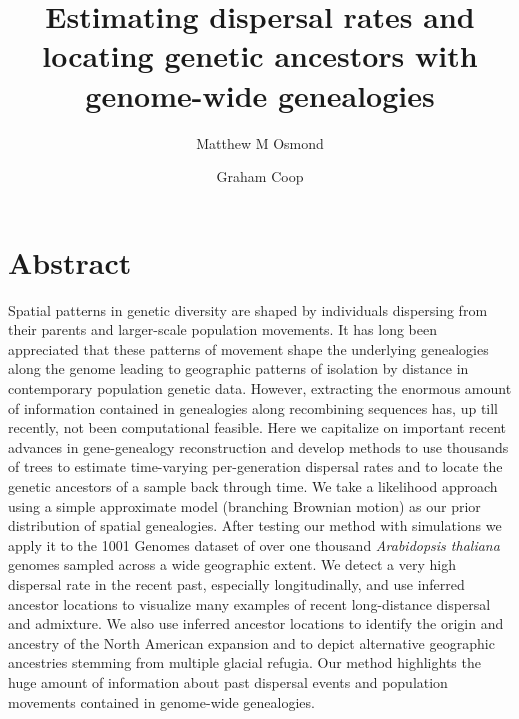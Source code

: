 \documentclass[12pt]{article}
\title{Estimating dispersal rates and locating genetic ancestors with genome-wide genealogies}
\author[1]{Matthew M Osmond}
\author[2]{Graham Coop}
\affil[1]{Department of Ecology \& Evolutionary Biology, University of Toronto}
\affil[2]{Department of Evolution \& Ecology and Center for Population Biology, University of California - Davis}
\date{}
\begin{document}
\linenumbers

\maketitle

\section*{Abstract}

Spatial patterns in genetic diversity are shaped by individuals dispersing from their parents and larger-scale population movements. 
It has long been appreciated that these patterns of movement shape the underlying genealogies along the genome leading to geographic patterns of isolation by distance in contemporary population genetic data.
However, extracting the enormous amount of information contained in genealogies along recombining sequences has, up till recently, not been computational feasible.
Here we capitalize on important recent advances in gene-genealogy reconstruction and develop methods to use thousands of trees to estimate time-varying per-generation dispersal rates and to locate the genetic ancestors of a sample back through time.
We take a likelihood approach using a simple approximate model (branching Brownian motion) as our prior distribution of spatial genealogies. 
After testing our method with simulations we apply it to the 1001 Genomes dataset of over one thousand \textit{Arabidopsis thaliana} genomes sampled across a wide geographic extent. 
We detect a very high dispersal rate in the recent past, especially longitudinally, and use inferred ancestor locations to visualize many examples of recent long-distance dispersal and admixture. 
We also use inferred ancestor locations to identify the origin and ancestry of the North American expansion and to depict alternative geographic ancestries stemming from multiple glacial refugia. 
Our method highlights the huge amount of information about past dispersal events and population movements contained in genome-wide genealogies.  

%
\end{document}
